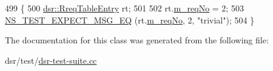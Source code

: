 \begin{DoxyCode}
499 \{
500   \hyperlink{structns3_1_1dsr_1_1RreqTableEntry}{dsr::RreqTableEntry} rt;
501 
502   rt.\hyperlink{structns3_1_1dsr_1_1RreqTableEntry_af4725e1e7ff15ef690a09c748ab50550}{m\_reqNo} = 2;
503   \hyperlink{group__testing_ga7304ba46a28d8cf08dfdfd6499cf7068}{NS\_TEST\_EXPECT\_MSG\_EQ} (rt.\hyperlink{structns3_1_1dsr_1_1RreqTableEntry_af4725e1e7ff15ef690a09c748ab50550}{m\_reqNo}, 2, \textcolor{stringliteral}{"trivial"});
504 \}
\end{DoxyCode}


The documentation for this class was generated from the following file\+:\begin{DoxyCompactItemize}
\item 
dsr/test/\hyperlink{dsr-test-suite_8cc}{dsr-\/test-\/suite.\+cc}\end{DoxyCompactItemize}
